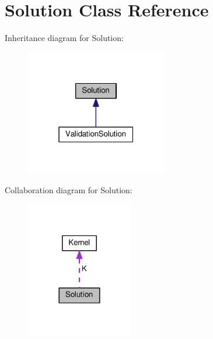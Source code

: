 \hypertarget{class_solution}{}\section{Solution Class Reference}
\label{class_solution}


Inheritance diagram for Solution\+:\nopagebreak
\begin{figure}[H]
\begin{center}
\leavevmode
\includegraphics[width=175pt]{class_solution__inherit__graph}
\end{center}
\end{figure}


Collaboration diagram for Solution\+:\nopagebreak
\begin{figure}[H]
\begin{center}
\leavevmode
\includegraphics[width=132pt]{class_solution__coll__graph}
\end{center}
\end{figure}
